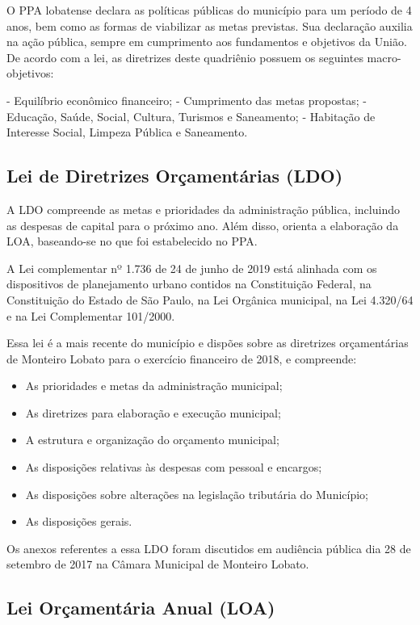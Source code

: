 	O PPA lobatense declara as políticas públicas do município para um período de 4 anos, bem como as formas de viabilizar as metas previstas. Sua declaração auxilia na ação pública, sempre em cumprimento aos fundamentos e objetivos da União. De acordo com a lei, as diretrizes deste quadriênio possuem os seguintes macro-objetivos:
	
	-	Equilíbrio econômico financeiro;
	-	Cumprimento das metas propostas;
	-	Educação, Saúde, Social, Cultura, Turismos e Saneamento;
	-	Habitação de Interesse Social, Limpeza Pública e Saneamento.
	
	\subsection{Lei de Diretrizes Orçamentárias (LDO)}
	
	A LDO compreende as metas e prioridades da administração pública, incluindo as despesas de capital para o próximo ano. Além disso, orienta a elaboração da LOA, baseando-se no que foi estabelecido no PPA.
	
	A Lei complementar nº 1.736 de 24 de junho de 2019 está alinhada com os dispositivos de planejamento urbano contidos na Constituição Federal, na Constituição do Estado de São Paulo, na Lei Orgânica municipal, na Lei 4.320/64 e na Lei Complementar 101/2000.
	
	Essa lei é a mais recente do município e dispões sobre as diretrizes orçamentárias de Monteiro Lobato para o exercício financeiro de 2018, e compreende:
	
	\begin{itemize}
	\item As prioridades e metas da administração municipal;
	\item As diretrizes para elaboração e execução municipal;
	\item A estrutura e organização do orçamento municipal;
	\item As disposições relativas às despesas com pessoal e encargos;
	\item As disposições sobre alterações na legislação tributária do Município;
	\item As disposições gerais.
	\end{itemize}

	Os anexos referentes a essa LDO foram discutidos em audiência pública dia 28 de setembro de 2017 na Câmara Municipal de Monteiro Lobato.
	
	\subsection{Lei Orçamentária Anual (LOA)}
	
